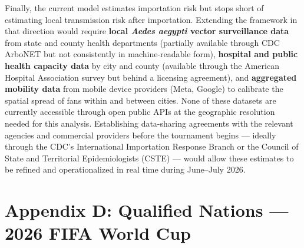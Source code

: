 \documentclass[12pt]{article}
\begin{document}
Finally, the current model estimates importation risk but stops short
of estimating local transmission risk after importation. Extending the
framework in that direction would require \textbf{local
\textit{Aedes aegypti} vector surveillance data} from state and
county health departments (partially available through CDC ArboNET but
not consistently in machine-readable form), \textbf{hospital and
public health capacity data} by city and county (available through
the American Hospital Association survey but behind a licensing
agreement), and \textbf{aggregated mobility data} from mobile device
providers (Meta, Google) to calibrate the spatial spread of fans
within and between cities. None of these datasets are currently
accessible through open public APIs at the geographic resolution
needed for this analysis. Establishing data-sharing agreements with
the relevant agencies and commercial providers before the tournament
begins --- ideally through the CDC's International Importation
Response Branch or the Council of State and Territorial Epidemiologists
(CSTE) --- would allow these estimates to be refined and operationalized
in real time during June--July 2026.

\newpage
\section*{Appendix D: Qualified Nations — 2026 FIFA World Cup}
\end{document}
